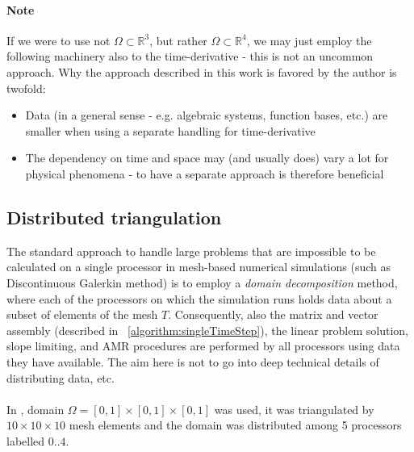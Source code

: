 \paragraph{Note}
If we were to use not $\Omega\subset\mathbb{R}^3$, but rather $\Omega\subset\mathbb{R}^4$, we may just employ the following machinery also to the time-derivative - this is not an uncommon approach. Why the approach described in this work is favored by the author is twofold:
\begin{itemize}
    \item Data (in a general sense - e.g. algebraic systems, function bases, etc.) are smaller when using a separate handling for time-derivative
    \item The dependency on time and space may (and usually does) vary a lot for physical phenomena - to have a separate approach is therefore beneficial
\end{itemize}
\subsection{Distributed triangulation}
\label{section:ditributedTria}
The standard approach to handle large problems that are impossible to be calculated on a single processor in mesh-based numerical simulations (such as Discontinuous Galerkin method) is to employ a \textit{domain decomposition} method, where each of the processors on which the simulation runs holds data about a subset of elements of the mesh $T$.
Consequently, also the matrix and vector assembly (described in ~\cref{algorithm:singleTimeStep}), the linear problem solution, slope limiting, and AMR procedures are performed by all processors using data they have available. The aim here is not to go into deep technical details of distributing data, etc.
\paragraph{}
In , domain $\Omega = \left[0, 1\right] \times \left[0, 1\right] \times \left[0, 1\right]$ was used, it was triangulated by $10 \times 10 \times 10$ mesh elements and the domain was distributed among 5 processors labelled $0..4$.

